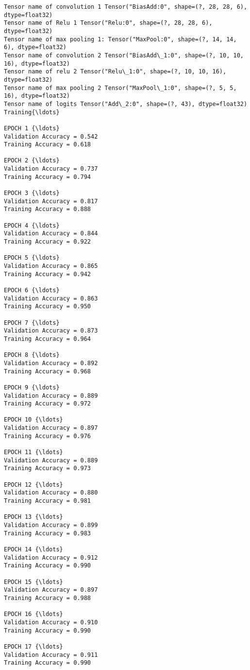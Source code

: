 \documentclass[11pt]{article}
\begin{document}
    \begin{Verbatim}[commandchars=\\\{\}]
Tensor name of convolution 1 Tensor("BiasAdd:0", shape=(?, 28, 28, 6), dtype=float32)
Tensor name of Relu 1 Tensor("Relu:0", shape=(?, 28, 28, 6), dtype=float32)
Tensor name of max pooling 1: Tensor("MaxPool:0", shape=(?, 14, 14, 6), dtype=float32)
Tensor name of convolution 2 Tensor("BiasAdd\_1:0", shape=(?, 10, 10, 16), dtype=float32)
Tensor name of relu 2 Tensor("Relu\_1:0", shape=(?, 10, 10, 16), dtype=float32)
Tensor name of max pooling 2 Tensor("MaxPool\_1:0", shape=(?, 5, 5, 16), dtype=float32)
Tensor name of logits Tensor("Add\_2:0", shape=(?, 43), dtype=float32)
Training{\ldots}

EPOCH 1 {\ldots}
Validation Accuracy = 0.542
Training Accuracy = 0.618

EPOCH 2 {\ldots}
Validation Accuracy = 0.737
Training Accuracy = 0.794

EPOCH 3 {\ldots}
Validation Accuracy = 0.817
Training Accuracy = 0.888

EPOCH 4 {\ldots}
Validation Accuracy = 0.844
Training Accuracy = 0.922

EPOCH 5 {\ldots}
Validation Accuracy = 0.865
Training Accuracy = 0.942

EPOCH 6 {\ldots}
Validation Accuracy = 0.863
Training Accuracy = 0.950

EPOCH 7 {\ldots}
Validation Accuracy = 0.873
Training Accuracy = 0.964

EPOCH 8 {\ldots}
Validation Accuracy = 0.892
Training Accuracy = 0.968

EPOCH 9 {\ldots}
Validation Accuracy = 0.889
Training Accuracy = 0.972

EPOCH 10 {\ldots}
Validation Accuracy = 0.897
Training Accuracy = 0.976

EPOCH 11 {\ldots}
Validation Accuracy = 0.889
Training Accuracy = 0.973

EPOCH 12 {\ldots}
Validation Accuracy = 0.880
Training Accuracy = 0.981

EPOCH 13 {\ldots}
Validation Accuracy = 0.899
Training Accuracy = 0.983

EPOCH 14 {\ldots}
Validation Accuracy = 0.912
Training Accuracy = 0.990

EPOCH 15 {\ldots}
Validation Accuracy = 0.897
Training Accuracy = 0.988

EPOCH 16 {\ldots}
Validation Accuracy = 0.910
Training Accuracy = 0.990

EPOCH 17 {\ldots}
Validation Accuracy = 0.911
Training Accuracy = 0.990


\end{Verbatim}
\end{document}
